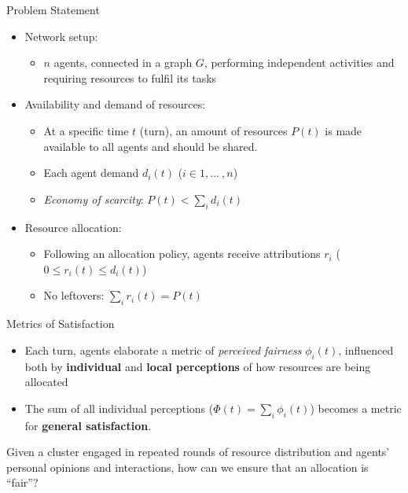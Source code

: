 \begin{frame}{Problem Statement}

\begin{itemize}
\tightlist
\item
  Network setup:

  \begin{itemize}
  \tightlist
  \item
    \(n\) agents, connected in a graph \(G\), performing independent
    activities and requiring resources to fulfil its tasks
  \end{itemize}
\item
  Availability and demand of resources:

  \begin{itemize}
  \tightlist
  \item
    At a specific time \(t\) (turn), an amount of resources \(P(t)\) is
    made available to all agents and should be shared.
  \item
    Each agent demand \(d_i(t)\) (\(i \in 1, ... ~, n\))
  \item
    \emph{Economy of scarcity}: \(P(t) < \sum_i d_i(t)\)
  \end{itemize}
\item
  Resource allocation:

  \begin{itemize}
  \tightlist
  \item
    Following an allocation policy, agents receive attributions \(r_i\)
    (\(0 \leq r_i(t) \leq d_i(t)\))
  \item
    No leftovers: \(\sum_i r_i(t) = P(t)\)
  \end{itemize}
\end{itemize}

\end{frame}

\begin{frame}{Metrics of Satisfaction}

\begin{itemize}
\tightlist
\item
  Each turn, agents elaborate a metric of \emph{perceived fairness}
  \(\phi_i(t)\), influenced both by \textbf{individual} and
  \textbf{local perceptions} of how resources are being allocated
\item
  The sum of all individual perceptions (\(\Phi(t) = \sum_i \phi_i(t)\))
  becomes a metric for \textbf{general satisfaction}.
\end{itemize}

\begin{block}{}

Given a cluster engaged in repeated rounds of resource distribution and
agents' personal opinions and interactions, how can we ensure that an
allocation is ``fair''?

\end{block}

\end{frame}

